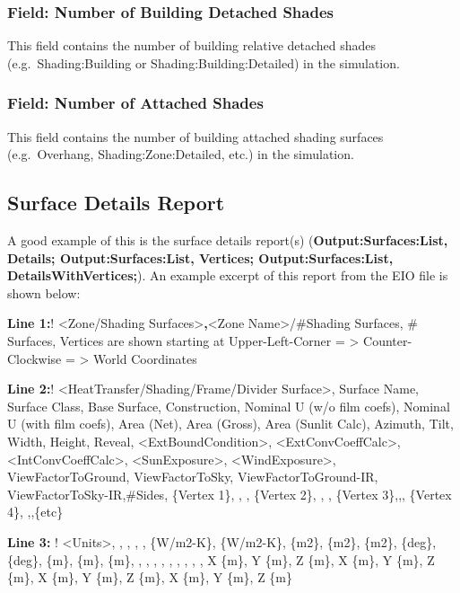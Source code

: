 \subsubsection{Field: Number of Building Detached Shades}\label{field-number-of-building-detached-shades}

This field contains the number of building relative detached shades (e.g.~Shading:Building or Shading:Building:Detailed) in the simulation.

\subsubsection{Field: Number of Attached Shades}\label{field-number-of-attached-shades}

This field contains the number of building attached shading surfaces (e.g.~Overhang, Shading:Zone:Detailed, etc.) in the simulation.

\subsection{Surface Details Report}\label{surface-details-report}

A good example of this is the surface details report(s) (\textbf{Output:Surfaces:List, Details; Output:Surfaces:List, Vertices; Output:Surfaces:List, DetailsWithVertices;}). An example excerpt of this report from the EIO file is shown below:

\textbf{Line 1:}! \textless{}Zone/Shading Surfaces\textgreater{}\textbf{,}\textless{}Zone Name\textgreater{}/\#Shading Surfaces, \# Surfaces, Vertices are shown starting at Upper-Left-Corner = \textgreater{} Counter-Clockwise = \textgreater{} World Coordinates

\textbf{Line 2:}! \textless{}HeatTransfer/Shading/Frame/Divider Surface\textgreater{}, Surface Name, Surface Class, Base Surface, Construction, Nominal U (w/o film coefs), Nominal U (with film coefs), Area (Net), Area (Gross), Area (Sunlit Calc), Azimuth, Tilt, Width, Height, Reveal, \textless{}ExtBoundCondition\textgreater{}, \textless{}ExtConvCoeffCalc\textgreater{}, \textless{}IntConvCoeffCalc\textgreater{}, \textless{}SunExposure\textgreater{}, \textless{}WindExposure\textgreater{}, ViewFactorToGround, ViewFactorToSky, ViewFactorToGround-IR, ViewFactorToSky-IR,\#Sides, \{Vertex 1\}, , , \{Vertex 2\}, , , \{Vertex 3\},,, \{Vertex 4\}, ,,\{etc\}

\textbf{Line 3:} ! \textless{}Units\textgreater{}, , , , , \{W/m2-K\}, \{W/m2-K\}, \{m2\}, \{m2\}, \{m2\}, \{deg\}, \{deg\}, \{m\}, \{m\}, \{m\}, , , , , , , , , , X \{m\}, Y \{m\}, Z \{m\}, X \{m\}, Y \{m\}, Z \{m\}, X \{m\}, Y \{m\}, Z \{m\}, X \{m\}, Y \{m\}, Z \{m\}

